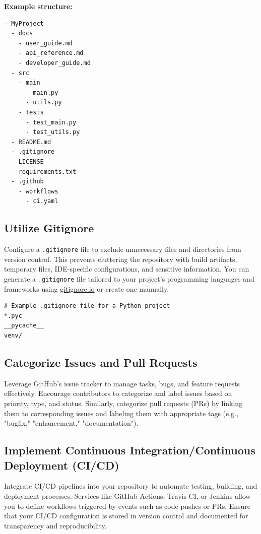 \documentclass[hidelinks]{article}
\begin{document}
\textbf{Example structure:}

\begin{verbatim}
- MyProject
  - docs
    - user_guide.md
    - api_reference.md
    - developer_guide.md
  - src
    - main
      - main.py
      - utils.py
    - tests
      - test_main.py
      - test_utils.py
  - README.md
  - .gitignore
  - LICENSE
  - requirements.txt
  - .github
    - workflows
      - ci.yaml
\end{verbatim}

\subsection*{Utilize Gitignore}
Configure a \texttt{.gitignore} file to exclude unnecessary files and directories from version control. This prevents cluttering the repository with build artifacts, temporary files, IDE-specific configurations, and sensitive information. You can generate a \texttt{.gitignore} file tailored to your project's programming languages and frameworks using \href{https://www.gitignore.io/}{gitignore.io} or create one manually.

\begin{verbatim}
# Example .gitignore file for a Python project
*.pyc
__pycache__
venv/
\end{verbatim}

\subsection*{Categorize Issues and Pull Requests}
Leverage GitHub's issue tracker to manage tasks, bugs, and feature requests effectively. Encourage contributors to categorize and label issues based on priority, type, and status. Similarly, categorize pull requests (PRs) by linking them to corresponding issues and labeling them with appropriate tags (e.g., "bugfix," "enhancement," "documentation").

\subsection*{Implement Continuous Integration/Continuous Deployment (CI/CD)}
Integrate CI/CD pipelines into your repository to automate testing, building, and deployment processes. Services like GitHub Actions, Travis CI, or Jenkins allow you to define workflows triggered by events such as code pushes or PRs. Ensure that your CI/CD configuration is stored in version control and documented for transparency and reproducibility.
\end{document}
